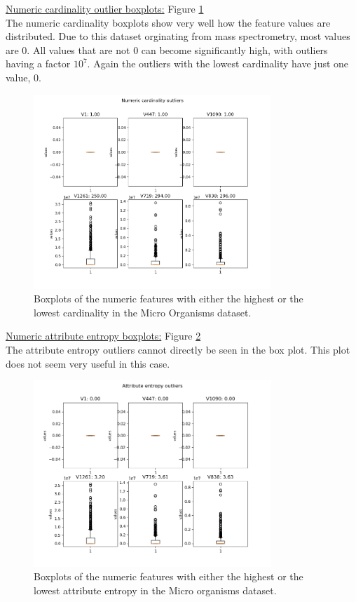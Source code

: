 \documentclass[10pt,a4paper]{report}
\begin{document}
\begin{itemize}
		\underline{Numeric cardinality outlier boxplots:} Figure \ref{fig:MOCardNum} \\
		
		The numeric cardinality boxplots show very well how the feature values are distributed. Due to this dataset orginating from mass spectrometry, most values are 0. All values that are not 0 can become significantly high, with outliers having a factor $10^7$. Again the outliers with the lowest cardinality have just one value, 0.
		
		\begin{figure}[]
			\centering
			\includegraphics[width=0.8\textwidth]{MO_Card_Num.png}
			\caption{Boxplots of the numeric features with either the highest or the lowest cardinality in the Micro Organisms dataset.}
			\label{fig:MOCardNum}
		\end{figure}
		
		\underline{Numeric attribute entropy boxplots:} Figure \ref{fig:MOAttEntNum} \\
		
		The attribute entropy outliers cannot directly be seen in the box plot. This plot does not seem very useful in this case.
		
		\begin{figure}[]
			\centering
			\includegraphics[width=0.8\textwidth]{MO_AttEnt_Num.png}
			\caption{Boxplots of the numeric features with either the highest or the lowest attribute entropy in the Micro organisms dataset.}
			\label{fig:MOAttEntNum}
		\end{figure}
		
	\end{itemize}	
	
\end{document}
